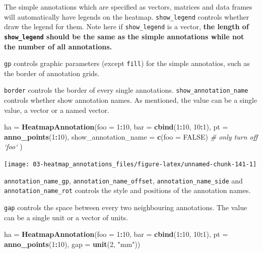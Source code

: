 \documentclass[]{book}
\newenvironment{Shaded}{\begin{snugshade}}{\end{snugshade}}
\newcommand{\KeywordTok}[1]{\textcolor[rgb]{0.13,0.29,0.53}{\textbf{#1}}}
\newcommand{\DataTypeTok}[1]{\textcolor[rgb]{0.13,0.29,0.53}{#1}}
\newcommand{\DecValTok}[1]{\textcolor[rgb]{0.00,0.00,0.81}{#1}}
\newcommand{\StringTok}[1]{\textcolor[rgb]{0.31,0.60,0.02}{#1}}
\newcommand{\CommentTok}[1]{\textcolor[rgb]{0.56,0.35,0.01}{\textit{#1}}}
\newcommand{\OtherTok}[1]{\textcolor[rgb]{0.56,0.35,0.01}{#1}}
\newcommand{\OperatorTok}[1]{\textcolor[rgb]{0.81,0.36,0.00}{\textbf{#1}}}
\newcommand{\NormalTok}[1]{#1}
\theoremstyle{definition}
\theoremstyle{definition}
\theoremstyle{definition}
\theoremstyle{remark}
\begin{document}
The simple annotations which are specified as vectors, matrices and data
frames will automatically have legends on the heatmap.
\texttt{show\_legend} controls whether draw the legend for them. Note
here if \texttt{show\_legend} is a vector, \textbf{the length of
\texttt{show\_legend} should be the same as the simple annotations while
not the number of all annotations.}

\texttt{gp} controls graphic parameters (except \texttt{fill}) for the
simple annotatios, such as the border of annotation grids.

\texttt{border} controls the border of every single annotations.
\texttt{show\_annotation\_name} controls whether show annotation names.
As mentioned, the value can be a single value, a vector or a named
vector.

\begin{Shaded}
\begin{Highlighting}[]
\NormalTok{ha =}\StringTok{ }\KeywordTok{HeatmapAnnotation}\NormalTok{(}\DataTypeTok{foo =} \DecValTok{1}\OperatorTok{:}\DecValTok{10}\NormalTok{, }
    \DataTypeTok{bar =} \KeywordTok{cbind}\NormalTok{(}\DecValTok{1}\OperatorTok{:}\DecValTok{10}\NormalTok{, }\DecValTok{10}\OperatorTok{:}\DecValTok{1}\NormalTok{),}
    \DataTypeTok{pt =} \KeywordTok{anno_points}\NormalTok{(}\DecValTok{1}\OperatorTok{:}\DecValTok{10}\NormalTok{),}
    \DataTypeTok{show_annotation_name =} \KeywordTok{c}\NormalTok{(}\DataTypeTok{foo =} \OtherTok{FALSE}\NormalTok{) }\CommentTok{# only turn off `foo`}
\NormalTok{)}
\end{Highlighting}
\end{Shaded}

\begin{center}\texttt{[image: 03-heatmap\_annotations\_files/figure-latex/unnamed-chunk-141-1]} \end{center}

\texttt{annotation\_name\_gp}, \texttt{annotation\_name\_offset},
\texttt{annotation\_name\_side} and \texttt{annotation\_name\_rot}
controls the style and positions of the annotation names.

\texttt{gap} controls the space between every two neighbouring
annotations. The value can be a single unit or a vector of units.

\begin{Shaded}
\begin{Highlighting}[]
\NormalTok{ha =}\StringTok{ }\KeywordTok{HeatmapAnnotation}\NormalTok{(}\DataTypeTok{foo =} \DecValTok{1}\OperatorTok{:}\DecValTok{10}\NormalTok{, }
    \DataTypeTok{bar =} \KeywordTok{cbind}\NormalTok{(}\DecValTok{1}\OperatorTok{:}\DecValTok{10}\NormalTok{, }\DecValTok{10}\OperatorTok{:}\DecValTok{1}\NormalTok{),}
    \DataTypeTok{pt =} \KeywordTok{anno_points}\NormalTok{(}\DecValTok{1}\OperatorTok{:}\DecValTok{10}\NormalTok{),}
    \DataTypeTok{gap =} \KeywordTok{unit}\NormalTok{(}\DecValTok{2}\NormalTok{, }\StringTok{"mm"}\NormalTok{))}
\end{Highlighting}
\end{Shaded}
\end{document}
